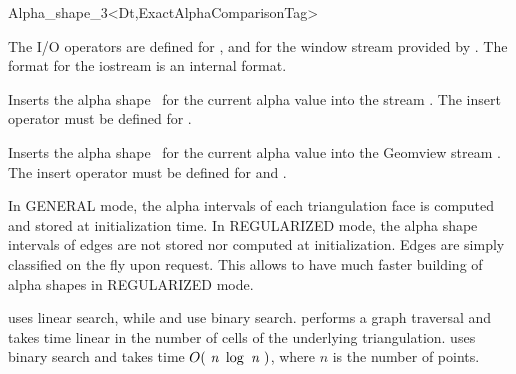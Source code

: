 \begin{ccRefClass} {Alpha_shape_3<Dt,ExactAlphaComparisonTag>}

The I/O operators are defined for , and for
the window stream provided by \cgal. The format for the iostream
is an internal format. 


{Inserts the alpha shape \ccVar\ for the current alpha value into the stream .
\ccPrecond The insert operator must be defined for .}



{Inserts the alpha shape \ccVar\ for the current alpha value into the Geomview stream .
\ccPrecond The insert operator must be defined for  and .}

\ccImplementation

In GENERAL mode, the alpha  intervals of each triangulation
face is computed and stored at initialization time.
In REGULARIZED mode, the alpha shape intervals of edges
are not stored nor computed at initialization.
Edges are simply classified on the fly upon request.
This allows to have much faster building of alpha shapes in
REGULARIZED mode.


 uses linear search, while 
 and  
use binary search.
 performs a graph traversal and takes time
linear in the number of cells of the underlying triangulation.
 uses binary search and takes time
$O(\mbox{ \em n } \log{\mbox{ \em n } })$, where  $n$ is the number of points.

\end{ccRefClass}

